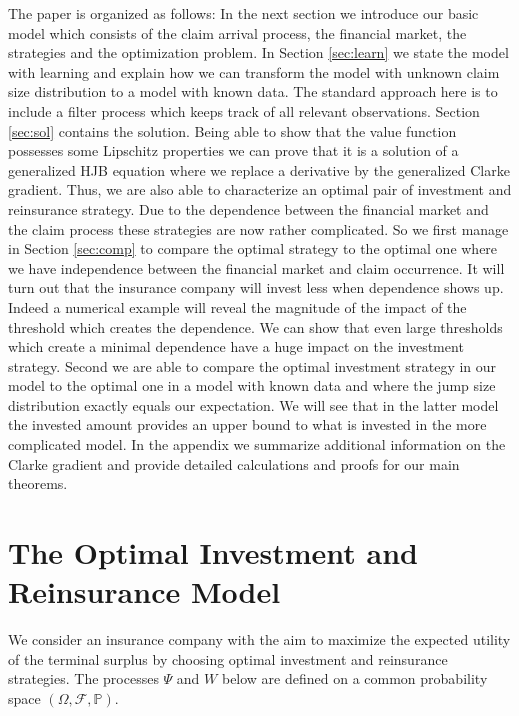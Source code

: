\documentclass[reqno, 11pt]{amsart}%
\newcommand{\Pop}{\mathbb{P}}
\theoremstyle{definition}
\numberwithin{equation}{section} \numberwithin{theorem}{section}
\begin{document}
The paper is organized as follows: In the next section we introduce our basic model which consists of the claim arrival process, the financial market, the strategies and the optimization problem. In Section \ref{sec:learn} we state the model with learning and explain how we can transform the model with unknown claim size distribution to a model with known data. The standard approach here is to include a filter process which keeps track of all relevant observations. Section \ref{sec:sol} contains the solution. Being able to show that the value function possesses some Lipschitz properties we can prove that it is a solution of a generalized HJB equation where we replace a derivative by the generalized Clarke gradient. Thus, we are also able to characterize an optimal pair of investment and reinsurance strategy.
Due to the dependence between the financial market and the claim  process these strategies are now rather complicated. So we first manage in Section \ref{sec:comp} to compare the optimal strategy to the optimal one where we have independence between the financial market and claim occurrence. It will turn out that the insurance company will invest less  when dependence shows up. Indeed a numerical example will reveal the magnitude of the impact of the threshold which creates the dependence. We can show that even large thresholds which create a minimal dependence have a huge impact on the investment strategy. Second we are able to compare the optimal investment strategy in our model to the optimal one in a model with known data and where the jump size distribution exactly equals  our expectation. We will see that in the latter model the invested amount provides an upper bound to what is invested in the more complicated model. In the appendix we summarize additional information on the Clarke gradient and provide detailed calculations and proofs for our main theorems.



\section{The Optimal Investment and Reinsurance Model}\label{sec:model}
We consider an insurance company with the aim to maximize the expected utility of the terminal surplus by choosing optimal investment and reinsurance strategies. The processes $\Psi$ and $W$ below are defined on a common probability space $(\Omega,\mathcal{F},\Pop)$.
\end{document}
